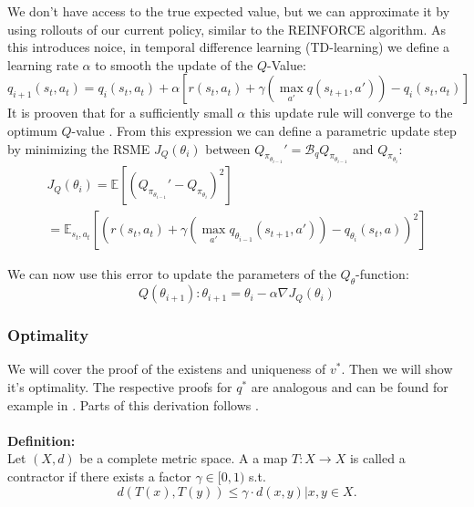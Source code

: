 We don't have access to the true expected value, but we can approximate it by using rollouts of our current policy, similar to the REINFORCE algorithm. As this introduces noice, 
in temporal difference learning (TD-learning) we define a learning rate $\alpha$ to smooth the update of the $Q$-Value:
\begin{equation}
    q_{i+1}(s_t, a_t) = q_i(s_t, a_t) + \alpha\left[r(s_t, a_t) + \gamma \left( \max_{a'} q(s_{t+1}, a')\right) - q_i(s_t, a_t) \right]
\end{equation}
It is prooven that for a sufficiently small $\alpha$ this update rule will converge to the optimum $Q$-value \cite{Watkins1992}. From this expression we can define a parametric update step by minimizing 
the RSME $J_Q(\theta_{i})$ between $Q_{\pi_{\theta_{i-1}}}' = \mathcal{B}_q Q_{\pi_{\theta_{i-1}}}$ and $Q_{\pi_{\theta_i}}$:
\begin{equation}
    \begin{aligned}
        J_Q(\theta_{i}) = \mathbb{E}\left[\left( Q_{\pi_{\theta_{i-1}}}' - Q_{\pi_{\theta_i}} \right)^2\right]\\
        = \mathbb{E}_{s_t, a_t}\left[\left( r(s_t, a_t) + \gamma \left( \max_{a'} q_{\theta_{i-1}}(s_{t+1}, a')\right) - q_{\theta_{i}}(s_t, a)\right)^2\right]
    \end{aligned}
\end{equation}

We can now use this error to update the parameters of the $Q_{\theta}$-function:
\begin{equation}
    Q(\theta_{i+1}) : \theta_{i+1} = \theta_{i} - \alpha \nabla J_Q(\theta_{i})
\end{equation}
\subsubsection{Optimality}
\label{opt_contr}

We will cover the proof of the existens and uniqueness of $v^*$. Then we will show it's optimality. The respective proofs for $q^*$ are analogous and can be found for example in \cite{Watkins1992}.
Parts of this derivation follows \cite{optimality}.\\ \\

\textbf{Definition:}\\
Let $(X, d)$ be a complete metric space. A a map $T:X \rightarrow X$ is called a contractor if there exists a factor $\gamma \in [0, 1)$ s.t.
\begin{equation}
    d(T(x), T(y)) \leq \gamma \cdot d(x,y) | x,y \in X.
\end{equation}
\\ \\

